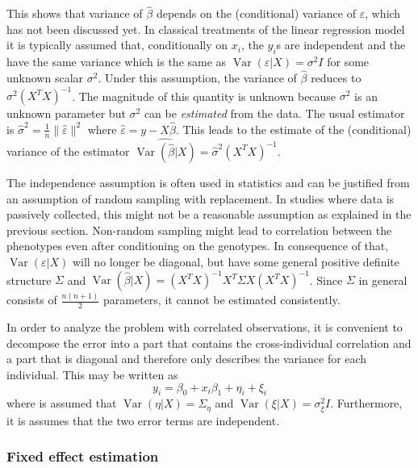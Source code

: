 \documentclass[review]{siamart0516}
\DeclareMathOperator{\Var}{Var}
\begin{document}
This shows that variance of $\hat{\beta}$ depends on the (conditional) variance of $\varepsilon$, which has not been discussed yet. In classical treatments of the linear regression model it is typically assumed that, conditionally on $x_i$, the $y_i$s are independent and the have the same variance which is the same as $\Var(\varepsilon|X)=\sigma^2 I$ for some unknown scalar $\sigma^2$. Under this assumption, the variance of $\hat{\beta}$ reduces to $\sigma^2 (X^TX)^{-1}$. The magnitude of this quantity is unknown because $\sigma^2$ is an unknown parameter but $\sigma^2$ can be \emph{estimated} from the data. The usual estimator is
$\hat{\sigma}^2=\frac{1}{n} \|\hat{\varepsilon}\|^2$
where $\hat{\varepsilon} = y - X\hat{\beta}$.
This leads to the estimate of the (conditional) variance of the estimator $\widehat{\Var(\hat{\beta}|X)} = \hat{\sigma}^2(X^TX)^{-1}$.

The independence assumption is often used in statistics and can be justified from an assumption of random sampling with replacement. In studies where data is passively collected, this might not be a reasonable assumption as explained in the previous section. Non-random sampling might lead to correlation between the phenotypes even after conditioning on the genotypes. In consequence of that, $\Var(\varepsilon|X)$ will no longer be diagonal, but have some general positive definite structure $\Sigma$ and $\Var(\hat{\beta}|X)=(X^TX)^{-1}X^T\Sigma X(X^TX)^{-1}$. Since $\Sigma$ in general consists of $\frac{n(n+1)}{2}$ parameters, it cannot be estimated consistently.

In order to analyze the problem with correlated observations, it is convenient to decompose the error into a part that contains the cross-individual correlation and a part that is diagonal and therefore only describes the variance for each individual. This may be written as
%
\begin{equation*}
    y_i = \beta_0 + x_i\beta_1 + \eta_i + \xi_i
\end{equation*}
%
where is assumed that $\Var(\eta|X)=\Sigma_\eta$ and $\Var(\xi|X)=\sigma^2_\xi I$. Furthermore, it is assumes that the two error terms are independent.


\label{sec:regress-correction}
\subsubsection{Fixed effect estimation}
\end{document}
